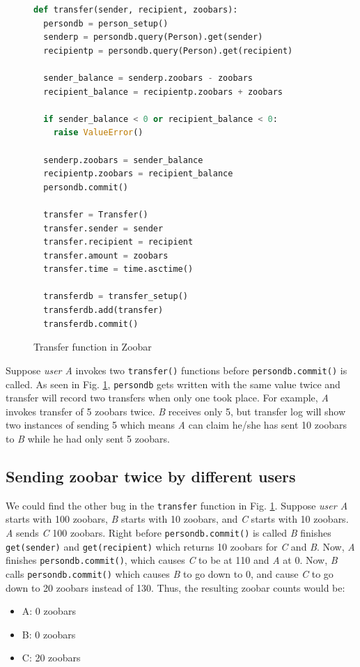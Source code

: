 \documentclass{llncs}
\begin{document}
\begin{figure}
  \begin{lstlisting}[language=Python]
def transfer(sender, recipient, zoobars):
  persondb = person_setup()
  senderp = persondb.query(Person).get(sender)
  recipientp = persondb.query(Person).get(recipient)

  sender_balance = senderp.zoobars - zoobars
  recipient_balance = recipientp.zoobars + zoobars

  if sender_balance < 0 or recipient_balance < 0:
    raise ValueError()

  senderp.zoobars = sender_balance
  recipientp.zoobars = recipient_balance
  persondb.commit()

  transfer = Transfer()
  transfer.sender = sender
  transfer.recipient = recipient
  transfer.amount = zoobars
  transfer.time = time.asctime()

  transferdb = transfer_setup()
  transferdb.add(transfer)
  transferdb.commit()
  \end{lstlisting}
  \caption{Transfer function in Zoobar}
  \label{fig:transfer}
\end{figure}

Suppose \textit{user A} invokes two \texttt{transfer()} functions
before \texttt{persondb.commit()} is called. As seen in
Fig. \ref{fig:transfer}, \texttt{persondb} gets written with the same
value twice and transfer will record two transfers when only one took
place. For example, \textit{A} invokes transfer of 5 zoobars
twice. \textit{B} receives only 5, but transfer log will show two
instances of sending 5 which means \textit{A} can claim he/she has
sent 10 zoobars to \textit{B} while he had only sent 5 zoobars.

\subsection{Sending zoobar twice by different users}

We could find the other bug in the \texttt{transfer} function in
Fig. \ref{fig:transfer}. Suppose \textit{user A} starts with 100
zoobars, \textit{B} starts with 10 zoobars, and \textit{C} starts with
10 zoobars. \textit{A} sends \textit{C} 100 zoobars. Right before
\texttt{persondb.commit()} is called \textit{B} finishes
\texttt{get(sender)} and \texttt{get(recipient)} which returns 10
zoobars for \textit{C} and \textit{B}. Now, \textit{A} finishes
\texttt{persondb.commit()}, which causes \textit{C} to be at 110 and
\textit{A} at 0. Now, \textit{B} calls \texttt{persondb.commit()}
which causes \textit{B} to go down to 0, and cause \textit{C} to go
down to 20 zoobars instead of 130. Thus, the resulting zoobar counts
would be:
\begin{itemize}
\item A: 0 zoobars
\item B: 0 zoobars
\item C: 20 zoobars
\end{itemize}
\end{document}
